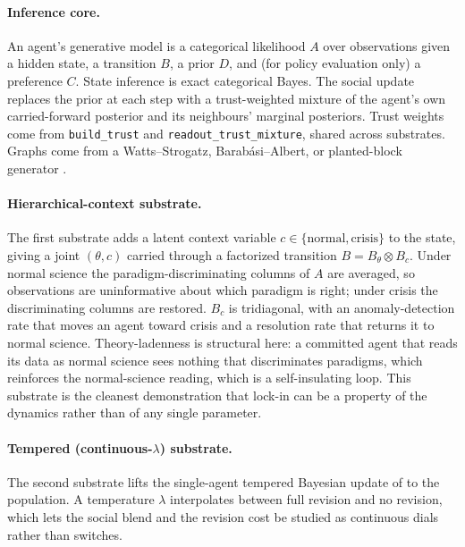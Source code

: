 \documentclass[11pt]{article}
\begin{document}
\paragraph{Inference core.} An agent's generative model is a categorical
likelihood $A$ over observations given a hidden state, a transition $B$, a prior
$D$, and (for policy evaluation only) a preference $C$. State inference is exact
categorical Bayes. The social update replaces the prior at each step with a
trust-weighted mixture of the agent's own carried-forward posterior and its
neighbours' marginal posteriors. Trust weights come from
\verb|build_trust| and \verb|readout_trust_mixture|, shared across substrates.
Graphs come from a Watts--Strogatz, Barab\'asi--Albert, or planted-block
generator \citep{wattsStrogatz1998SmallWorld}.

\paragraph{Hierarchical-context substrate.} The first substrate adds a latent
context variable $c \in \{\text{normal},\text{crisis}\}$ to the state, giving a
joint $(\theta,c)$ carried through a factorized transition $B = B_\theta \otimes
B_c$. Under normal science the paradigm-discriminating columns of $A$ are
averaged, so observations are uninformative about which paradigm is right; under
crisis the discriminating columns are restored. $B_c$ is tridiagonal, with an
anomaly-detection rate that moves an agent toward crisis and a resolution rate
that returns it to normal science. Theory-ladenness is structural here: a
committed agent that reads its data as normal science sees nothing that
discriminates paradigms, which reinforces the normal-science reading, which is a
self-insulating loop. This substrate is the cleanest demonstration that lock-in
can be a property of the dynamics rather than of any single parameter.

\paragraph{Tempered (continuous-$\lambda$) substrate.} The second substrate
lifts the single-agent tempered Bayesian update of
\citet{hylandAlbarracin2025MindChange} to the population. A temperature
$\lambda$ interpolates between full revision and no revision, which lets the
social blend and the revision cost be studied as continuous dials rather than
switches.
\end{document}
